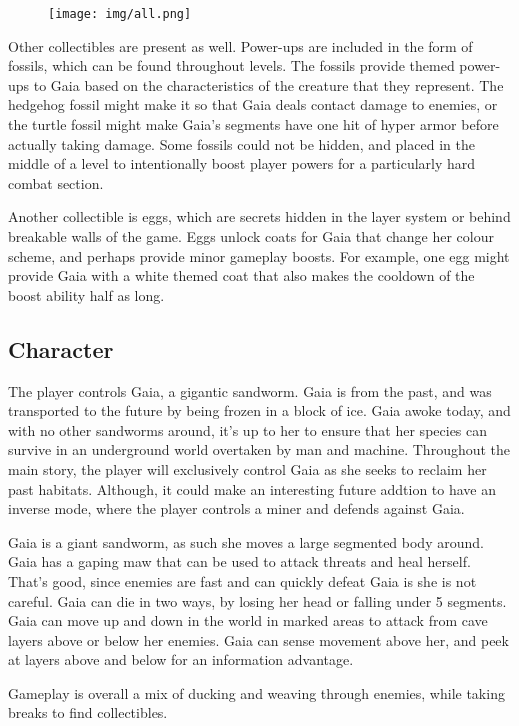 \documentclass[12pt]{report}
\begin{document}
\begin{figure}[h]
    \centering
    \texttt{[image: img/all.png]}
\end{figure}

Other collectibles are present as well. Power-ups are included in the 
form of fossils, which can be found throughout levels. The fossils
provide themed power-ups to Gaia based on the characteristics of the 
creature that they represent. The hedgehog fossil might make it so that 
Gaia deals contact damage to enemies, or the turtle fossil might make
Gaia's segments have one hit of hyper armor before actually taking
damage. Some fossils could not be hidden, and placed in the middle of a
level to intentionally boost player powers for a particularly hard combat
section.

Another collectible is eggs, which are secrets hidden in the layer system 
or behind breakable walls of the game. Eggs unlock coats for Gaia that 
change her colour scheme, and perhaps provide minor gameplay boosts. 
For example, one egg might provide Gaia with a white themed coat that 
also makes the cooldown of the boost ability half as long.

\pagebreak
\subsection*{Character}
The player controls Gaia, a gigantic sandworm. Gaia is from the past, 
and was transported to the future by being frozen in a block of ice.
Gaia awoke today, and with no other sandworms around, it's up to her to
ensure that her species can survive in an underground world overtaken by 
man and machine. Throughout the main story, the player will exclusively
control Gaia as she seeks to reclaim her past habitats. Although, it could
make an interesting future addtion to have an inverse mode, where the player
controls a miner and defends against Gaia.

Gaia is a giant sandworm, as such she moves a large segmented body around.
Gaia has a gaping maw that can be used to attack threats and heal herself.
That's good, since enemies are fast and can quickly defeat Gaia is she is 
not careful. Gaia can die in two ways, by losing her head or falling under 
5 segments. Gaia can move up and down in the world in marked areas to attack 
from cave layers above or below her enemies. Gaia can sense movement above
her, and peek at layers above and below for an information advantage.

Gameplay is overall a mix of ducking and weaving through enemies, while
taking breaks to find collectibles.
\end{document}
